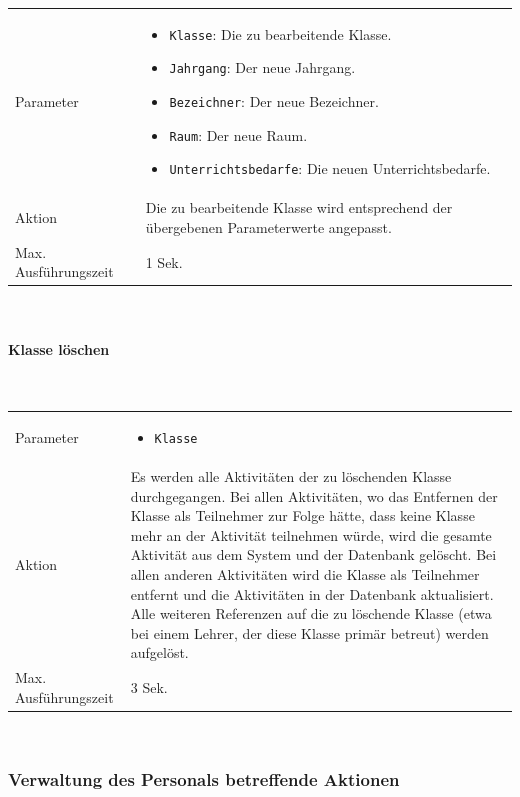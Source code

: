 \documentclass[fontsize=12pt,paper=a4,twoside]{scrartcl}
\begin{document}
\begin{tabularx}{\textwidth}{p{4cm}X}
Parameter & \begin{itemize}[itemsep=0pt, leftmargin = 0.5cm]
			\item \texttt{Klasse}: Die zu bearbeitende Klasse.
			\item \texttt{Jahrgang}: Der neue Jahrgang.
			\item \texttt{Bezeichner}: Der neue Bezeichner.
			\item \texttt{Raum}: Der neue Raum.
			\item \texttt{Unterrichtsbedarfe}: Die neuen Unterrichtsbedarfe.
			\end{itemize}\\
Aktion & Die zu bearbeitende Klasse wird entsprechend der übergebenen Parameterwerte angepasst. \\
Max. Ausführungszeit & 1 Sek. 
\end{tabularx}\\


\paragraph{Klasse löschen}\mbox{}\\

\begin{tabularx}{\textwidth}{p{4cm}X}
Parameter & \begin{itemize}[itemsep=0pt, leftmargin = 0.5cm]
			\item \texttt{Klasse}
			\end{itemize}\\
Aktion & Es werden alle Aktivitäten der zu löschenden Klasse durchgegangen. Bei allen Aktivitäten, wo das Entfernen der Klasse als Teilnehmer zur Folge hätte, dass keine Klasse mehr an der Aktivität teilnehmen würde, wird die gesamte Aktivität aus dem System und der Datenbank gelöscht. Bei allen anderen Aktivitäten wird die Klasse als Teilnehmer entfernt und die Aktivitäten in der Datenbank aktualisiert. Alle weiteren Referenzen  auf die zu löschende Klasse (etwa bei einem Lehrer, der diese Klasse primär betreut) werden aufgelöst. \\
Max. Ausführungszeit & 3 Sek. 
\end{tabularx}\\


\subsubsection{Verwaltung des Personals betreffende Aktionen}
\end{document}
